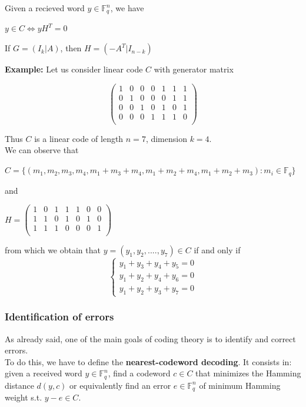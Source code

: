 \begin{propBox}{}{}
    Given a recieved word $y \in \mathbb{F}_q^n$, we have
    \begin{center}
        $y \in C \iff yH^T = 0$
    \end{center}
\end{propBox}
\medskip

\begin{propBox}{}{}
   If $G = (I_k | A)$, then $H = (-A^T | I_{n-k})$
\end{propBox}
\medskip

\noindent
\textbf{Example:}
Let us consider linear code $C$ with generator matrix
\begin{center}
    \[
    \begin{pmatrix}
        1 & 0 & 0 & 0 & 1 & 1 & 1 \\
        0 & 1 & 0 & 0 & 0 & 1 & 1 \\
        0 & 0 & 1 & 0 & 1 & 0 & 1 \\
        0 & 0 & 0 & 1 & 1 & 1 & 0\\
    \end{pmatrix}
    \]
\end{center}
\noindent
Thus $C$ is a linear code of length $n = 7$, dimension $k = 4$.\\
We can observe that
\begin{center}
    $C = \{(m_1, m_2, m_3, m_4, m_1 + m_3 + m_4, m_1 + m_2 + m_4, m_1 + m_2 + m_3) : m_i \in \mathbb{F}_q\}$
\end{center}
\noindent
and
\begin{center}
    $H = \begin{pmatrix}
        1 & 0 & 1 & 1 & 1 & 0 & 0 \\
        1 & 1 & 0 & 1 & 0 & 1 & 0 \\
        1 & 1 & 1 & 0 & 0 & 0 & 1 \\
    \end{pmatrix}$
\end{center}
\noindent
from which we obtain that $y = (y_1, y_2, ...., y_7) \in C$ if and only if
\[
\begin{cases}
    y_1 + y_3 + y_4 + y_5 = 0 \\
    y_1 + y_2 + y_4 + y_6 = 0 \\
    y_1 + y_2 + y_3 + y_7 = 0
\end{cases}
\]    

\subsubsection{Identification of errors}
As already said, one of the main goals of coding theory is to identify and correct errors.\\
To do this, we have to define the \textbf{nearest-codeword decoding}. It consists in: given a received word $y \in \mathbb{F}_q^n$, find a codeword $c \in C$ that minimizes the Hamming distance $d(y, c)$ or equivalently find an error $e \in \mathbb{F}_q^n$ of minimum Hamming weight s.t. $y - e \in C$.
\medskip

